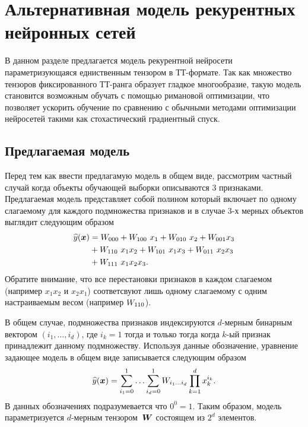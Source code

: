 
\section{Альтернативная модель рекурентных нейронных сетей}
В данном разделе предлагается модель рекурентной нейросети параметризующаяся едниственным тензором в ТТ-формате. Так как множество тензоров фиксированного ТТ-ранга образует гладкое многообразие, такую модель становится возможным обучать с помощью римановой оптимизации, что позволяет ускорить обучение по сравнению с обычными методами оптимизации нейросетей такими как стохастический градиентный спуск.

\subsection{Предлагаемая модель}
Перед тем как ввести предлагамую модель в общем виде, рассмотрим частный случай когда объекты обучающей выборки описываются $3$ признаками. Предлагаемая модель представляет собой полином который включает по одному слагаемому для каждого подмножества признаков и в случае $3$-х мерных объектов выглядит следующим образом
\begin{equation}
\label{eq:polynomial-model-example}
\begin{aligned}
\widehat{y}(\boldsymbol{x}) &= W_{000} + W_{100} \,\, x_1 + W_{010} \,\, x_2 + W_{001} x_3 \\
&+ W_{110} \,\, x_1 x_2 + W_{101} \,\, x_1 x_3 + W_{011} \,\, x_2 x_3 \\
&+ W_{111} \,\, x_1 x_2 x_3.
\end{aligned}
\end{equation}
Обратите внимание, что все перестановки признаков в каждом слагаемом (например $x_1 x_2$ и $x_2 x_1$) соответсвуют лишь одному слагаемому с одним настраиваемым весом (например $W_{110}$).

В общем случае, подмножества признаков индексируются $d$-мерным бинарным вектором $(i_1, \ldots, i_d)$, где $i_k = 1$ тогда и только тогда когда $k$-ый признак принадлежит данному подмножеству. Используя данные обозначение, уравнение задающее модель в общем виде записывается следующим образом
\begin{equation}
\label{eq:polynomial-model}
\widehat{y}(\boldsymbol{x}) = \sum_{i_1=0}^1 \ldots \sum_{i_d=0}^1 W_{i_1 \ldots i_d} \prod_{k=1}^d x_k^{i_k}.
\end{equation}
В данных обозначениях подразумевается что $0^0 = 1$.
Таким образом, модель параметризуется $d$-мерным тензором~$\boldsymbol{W}$ состоящем из $2^d$ элементов.


